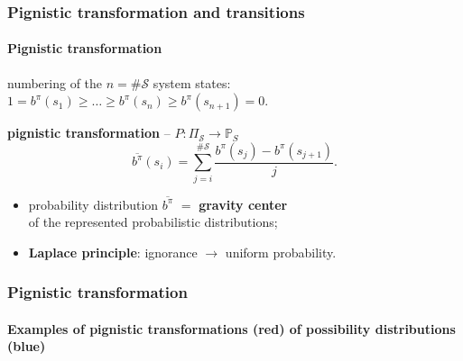 \documentclass[12pt,svgnames,table]{beamer}
\begin{document}
\begin{frame}
\frametitle{Pignistic transformation and transitions}
\framesubtitle{\footnotesize Pignistic transformation}
numbering of the $n = \# \mathcal{S}$ system states:
$1 = b^{\pi}(s_1) \geqslant \ldots \geqslant b^{\pi}(s_{n}) \geqslant b^{\pi}(s_{n+1}) = 0$.
\begin{exampleblock}{\textbf{pignistic transformation} -- $P: \Pi_{\mathcal{S}} \rightarrow \mathbb{P}_{S} $}
\[ \overline{b^{\pi}}(s_i) = \sum_{j=i}^{\# \mathcal{S}} \frac{b^{\pi}(s_j) - b^{\pi}(s_{j+1})}{j}.\]
\end{exampleblock}
\begin{itemize}
\item probability distribution $\overline{b^{\pi}}$ $=$ \textbf{gravity center} \\ 
\hspace{1cm} of the represented probabilistic distributions;
\item \textbf{Laplace principle}: ignorance $\rightarrow$ uniform probability.
\end{itemize}
\end{frame}

\begin{frame}
\frametitle{Pignistic transformation}
\framesubtitle{\footnotesize Examples of pignistic transformations (red) of possibility distributions (blue)}
\end{frame}
\end{document}
